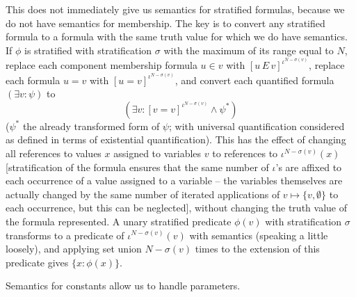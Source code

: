 \documentclass{slides}
\begin{document}
\begin{slide}
This does not immediately give us semantics for stratified formulas, because we do not have semantics for membership.  The key is to convert any stratified formula to a formula with the same truth value for which we do have semantics.  If $\phi$ is stratified with stratification $\sigma$ with the maximum of its range equal to $N$,
replace each component membership formula $u \in v$ with $[u\,E\,v]^{\iota^{N-\sigma(v)}}$, replace each formula $u=v$ with
$[u=v]^{\iota^{N-\sigma(v)}}$, and convert each quantified formula $(\exists v:\psi)$ to $$(\exists v:[v=v]^{\iota^{N-\sigma(v)}}\wedge \psi^*)$$ ($\psi^*$ the already transformed form of $\psi$; with universal quantification considered as defined in terms of existential quantification).  This has the effect of changing all references to values $x$  assigned 
to variables $v$ to references to $\iota^{N-\sigma(v)}(x)$ [stratification of the formula ensures that the same number of $\iota$'s are affixed to each occurrence of a value assigned to a variable -- the variables themselves are actually changed by the same number of iterated applications of $v \mapsto \{v,\emptyset\}$ to each occurrence, but this can be neglected], without changing the truth value of the formula represented.  A unary stratified predicate $\phi(v)$ with stratification $\sigma$ transforms to a predicate of $\iota^{N-\sigma(v)}(v)$ with semantics (speaking a little loosely), and applying set union $N-\sigma(v)$ times to the extension of this predicate gives
$\{x:\phi(x)\}$.

Semantics for constants allow us to handle parameters.

\end{slide}
\end{document}
